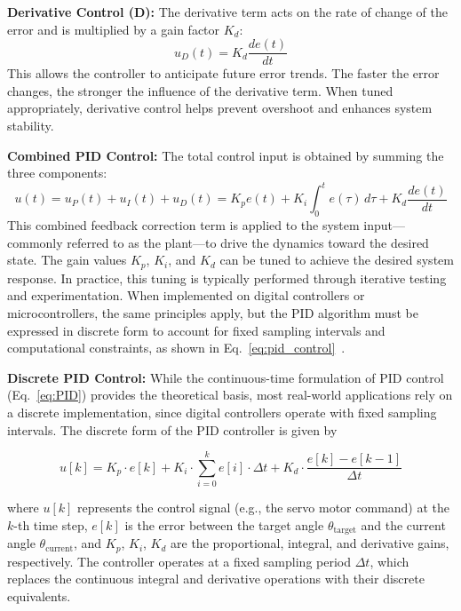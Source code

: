 \documentclass[english, bachelor, utf8]{base/thesis_telematics}
\begin{document}
\textbf{Derivative Control (D):}  
The derivative term acts on the rate of change of the error and is multiplied by a gain factor $K_d$:
\begin{equation}
    u_D(t) = K_d \frac{de(t)}{dt}
    \label{eq:D}
\end{equation}
This allows the controller to anticipate future error trends. The faster the error changes, the stronger the influence of the derivative term. When tuned appropriately, derivative control helps prevent overshoot and enhances system stability.

\textbf{Combined PID Control:}  
The total control input is obtained by summing the three components:
\begin{equation}
    u(t) = u_P(t) + u_I(t) + u_D(t) 
         = K_p e(t) + K_i \int_{0}^{t} e(\tau)\, d\tau + K_d \frac{de(t)}{dt}
    \label{eq:PID}
\end{equation}
This combined feedback correction term is applied to the system input—commonly referred to as the plant—to drive the dynamics toward the desired state. The gain values $K_p$, $K_i$, and $K_d$ can be tuned to achieve the desired system response. In practice, this tuning is typically performed through iterative testing and experimentation. When implemented on digital controllers or microcontrollers, the same principles apply, but the PID algorithm must be expressed in discrete form to account for fixed sampling intervals and computational constraints, as shown in Eq.~\ref{eq:pid_control}~\cite{vectornav_math_controls,PIDBook2}.

\textbf{Discrete PID Control:}  
While the continuous-time formulation of PID control (Eq.~\ref{eq:PID}) provides the theoretical basis, most real-world applications rely on a discrete implementation, since digital controllers operate with fixed sampling intervals. The discrete form of the PID controller is given by

\begin{equation}
u[k] = K_p \cdot e[k] + K_i \cdot \sum_{i=0}^{k} e[i] \cdot \Delta t + K_d \cdot \frac{e[k] - e[k-1]}{\Delta t}
\label{eq:pid_control}
\end{equation}

where $u[k]$ represents the control signal (e.g., the servo motor command) at the $k$-th time step, $e[k]$ is the error between the target angle $\theta_{\text{target}}$ and the current angle $\theta_{\text{current}}$, and $K_p$, $K_i$, $K_d$ are the proportional, integral, and derivative gains, respectively. The controller operates at a fixed sampling period $\Delta t$, which replaces the continuous integral and derivative operations with their discrete equivalents.
\end{document}
